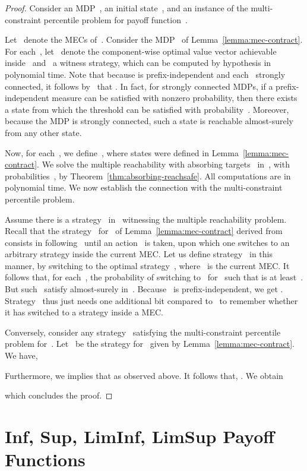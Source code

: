 \documentclass{llncs}
\begin{document}
\begin{proof}
  Consider an MDP~, an initial state~, and an instance of the multi-constraint percentile problem  for payoff function~.
  
  Let~ denote the MECs of~.
  Consider the MDP~ of Lemma~\ref{lemma:mec-contract}.
  For each~, let~ denote the component-wise optimal value vector achievable inside~ and~ a witness strategy,
  which can be computed by hypothesis in polynomial time. Note that because  is prefix-independent and each~ strongly connected,
  it follows by~\cite{Chatterjee-tcs07} that .
  In fact, for strongly connected MDPs, if a prefix-independent measure can be satisfied with nonzero probability, then there exists a state from which 
  the threshold can be satisfied with probability~.
  Moreover, because the MDP is strongly connected, such a state is reachable almost-surely from any other state.

  Now, for each~, we define~,
  where states  were defined in Lemma~\ref{lemma:mec-contract}.
  We solve the multiple reachability with absorbing targets~ in~, 
  with probabilities~, by Theorem~\ref{thm:absorbing-reachsafe}.
  All computations are in polynomial time. We now establish the connection with the multi-constraint percentile problem.

  Assume there is a strategy~ in~ witnessing the multiple reachability problem. 
  Recall that the strategy~ for~ of Lemma~\ref{lemma:mec-contract} derived from~ consists in following~ until an action~ is taken, upon which 
  one switches to an arbitrary strategy inside the current MEC. Let us define strategy~ in this manner,
  by switching to the optimal strategy~, where~ is the current MEC. It follows that, for each~, the probability of switching to~ for~ such that
   is at least~. But such~ satisfy  almost-surely in~. Because~ is prefix-independent,
  we get .
  Strategy~ thus just needs one additional bit compared to~ to remember whether it has switched to a strategy inside a MEC.

  Conversely, consider any strategy~ satisfying the multi-constraint percentile problem for~. Let~ be the strategy 
  for~ given by Lemma~\ref{lemma:mec-contract}.
  We have,
  
Furthermore, we  implies that
 as observed above. It follows that,
.
We obtain 

which concludes the proof.
\end{proof}

\section{Inf, Sup, LimInf, LimSup Payoff Functions}
\label{section:quant-reg}
\label{subsection:single-simple}
\end{document}
